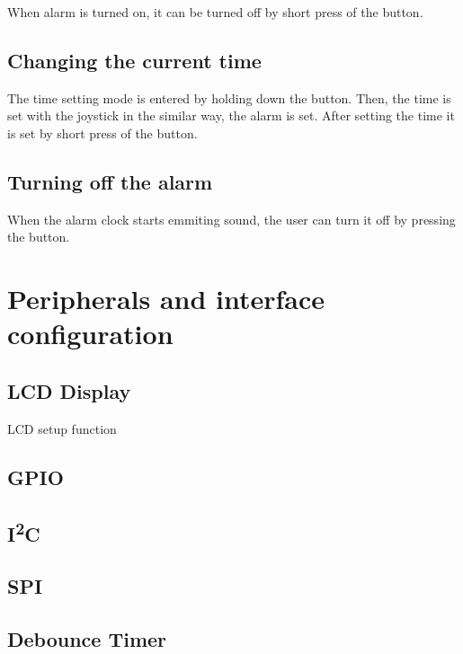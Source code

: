 \documentclass[11pt]{article}
\newcommand{\code}[3]{}
\begin{document}
    When alarm is turned on, it can be turned off by short press of the button.

    \subsection{Changing the current time}
    The time setting mode is entered by holding down the button.
    Then, the time is set with the joystick in the similar way, the alarm is set.
    After setting the time it is set by short press of the button.

    \subsection{Turning off the alarm}
    When the alarm clock starts emmiting sound, the user can turn it off by pressing the button.

    \section{Peripherals and interface configuration}
    \subsection{LCD Display}
    \begin{program}[h]
        \code{63}{96}{display.h}
        \caption{LCD setup function}
    \end{program}

    \subsection{GPIO}

    \subsection{I\textsuperscript{2}C}

    \subsection{SPI}

    \subsection{Debounce Timer}
\end{document}
